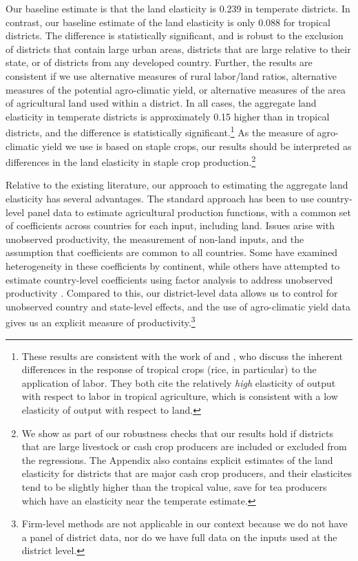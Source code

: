 \documentclass[11pt]{article}
\begin{document}
Our baseline estimate is that the land elasticity is 0.239 in temperate districts. In contrast, our baseline estimate of the land elasticity is only 0.088 for tropical districts. The difference is statistically significant, and is robust to the exclusion of districts that contain large urban areas, districts that are large relative to their state, or of districts from any developed country. Further, the results are consistent if we use alternative measures of rural labor/land ratios, alternative measures of the potential agro-climatic yield, or alternative measures of the area of agricultural land used within a district. In all cases, the aggregate land elasticity in temperate districts is approximately 0.15 higher than in tropical districts, and the difference is statistically significant.\footnote{These results are consistent with the work of \citet{Ruthenberg:1976zr} and \citet{bray1994}, who discuss the inherent differences in the response of tropical crops (rice, in particular) to the application of labor. They both cite the relatively \textit{high} elasticity of output with respect to labor in tropical agriculture, which is consistent with a low elasticity of output with respect to land.} As the measure of agro-climatic yield we use is based on staple crops, our results should be interpreted as differences in the land elasticity in staple crop production.\footnote{We show as part of our robustness checks that our results hold if districts that are large livestock or cash crop producers are included or excluded from the regressions. The Appendix also contains explicit estimates of the land elasticity for districts that are major cash crop producers, and their elasticites tend to be slightly higher than the tropical value, save for tea producers which have an elasticity near the temperate estimate.}

Relative to the existing literature, our approach to estimating the aggregate land elasticity has several advantages. The standard approach has been to use country-level panel data \citep{Hayami:1970ly,Hayami:1985cr,cpr1997,mm2001,Mundlak:2000dq,mbl2012,et2013mango} to estimate agricultural production functions, with a common set of coefficients across countries for each input, including land. Issues arise with unobserved productivity, the measurement of non-land inputs, and the assumption that coefficients are common to all countries. Some have examined heterogeneity in these coefficients \citep{gg2003,Wiebe2003Resource-Qualit} by continent, while others have attempted to estimate country-level coefficients using factor analysis to address unobserved productivity \citep{et2013mango,ev2016clim}. Compared to this, our district-level data allows us to control for unobserved country and state-level effects, and the use of agro-climatic yield data gives us an explicit measure of productivity.\footnote{Firm-level methods \citep{olleypakes1996,levpetrin2003} are not applicable in our context because we do not have a panel of district data, nor do we have full data on the inputs used at the district level.} 
\end{document}
